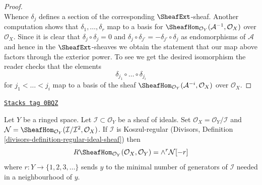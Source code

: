 \begin{proof}
$$$$
Whence $\delta_j$ defines a section of the corresponding
$\SheafExt$-sheaf.
Another computation shows that $\delta_1, \ldots, \delta_r$
map to a basis for $\SheafHom_{\mathcal{O}_Y}(\mathcal{A}^{-1}, \mathcal{O}_X)$
over $\mathcal{O}_X$.
Since it is clear that $\delta_j \circ \delta_j = 0$
and $\delta_j \circ \delta_{j'} = - \delta_{j'} \circ \delta_j$
as endomorphisms of $\mathcal{A}$ and hence in the
$\SheafExt$-sheaves
we obtain the statement that our map above factors through
the exterior power. To see we get the desired isomorphism
the reader checks that the elements
$$
\delta_{j_1} \circ \ldots \circ \delta_{j_i}
$$
for $j_1 < \ldots < j_i$ map to a basis of the sheaf
$\SheafHom_{\mathcal{O}_Y}(\mathcal{A}^{-i}, \mathcal{O}_X)$
over $\mathcal{O}_X$.
\end{proof}

\begin{lemma}
\label{duality-lemma-regular-immersion-ext}
\href{https://stacks.math.columbia.edu/tag/0BQZ}{\texttt{Stacks tag 0BQZ}}

Let $Y$ be a ringed space. Let $\mathcal{I} \subset \mathcal{O}_Y$
be a sheaf of ideals. Set $\mathcal{O}_X = \mathcal{O}_Y/\mathcal{I}$ and
$\mathcal{N} =
\SheafHom_{\mathcal{O}_Y}(\mathcal{I}/\mathcal{I}^2, \mathcal{O}_X)$.
If $\mathcal{I}$ is Koszul-regular
(Divisors, Definition \ref{divisors-definition-regular-ideal-sheaf}) then
$$
R\SheafHom_{\mathcal{O}_Y}(\mathcal{O}_X, \mathcal{O}_Y) =
\wedge^r \mathcal{N}[-r]
$$
where $r : Y \to \{1, 2, 3, \ldots \}$ sends $y$ to
the minimal number of generators of $\mathcal{I}$ needed in a neighbourhood
of $y$.
\end{lemma}

